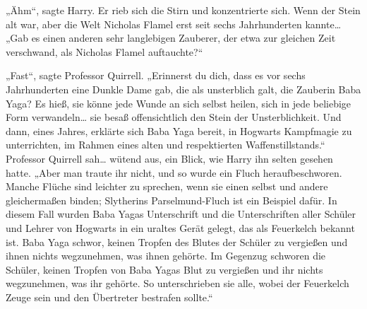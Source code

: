 „Ähm“, sagte Harry.
Er rieb sich die Stirn und konzentrierte sich.
Wenn der Stein alt war, aber die Welt Nicholas Flamel erst seit sechs Jahrhunderten kannte…
„Gab es einen anderen sehr langlebigen Zauberer, der etwa zur gleichen Zeit verschwand, als Nicholas Flamel auftauchte?“

„Fast“, sagte Professor Quirrell.
„Erinnerst du dich, dass es vor sechs Jahrhunderten eine Dunkle Dame gab, die als unsterblich galt, die Zauberin Baba Yaga? Es hieß, sie könne jede Wunde an sich selbst heilen, sich in jede beliebige Form verwandeln… sie besaß offensichtlich den Stein der Unsterblichkeit. Und dann, eines Jahres, erklärte sich Baba Yaga bereit, in Hogwarts Kampfmagie zu unterrichten, im Rahmen eines alten und respektierten Waffenstillstands.“
Professor Quirrell sah… wütend aus, ein Blick, wie Harry ihn selten gesehen hatte.
„Aber man traute ihr nicht, und so wurde ein Fluch heraufbeschworen. Manche Flüche sind leichter zu sprechen, wenn sie einen selbst und andere gleichermaßen binden; Slytherins Parselmund-Fluch ist ein Beispiel dafür. In diesem Fall wurden Baba Yagas Unterschrift und die Unterschriften aller Schüler und Lehrer von Hogwarts in ein uraltes Gerät gelegt, das als Feuerkelch bekannt ist. Baba Yaga schwor, keinen Tropfen des Blutes der Schüler zu vergießen und ihnen nichts wegzunehmen, was ihnen gehörte. Im Gegenzug schworen die Schüler, keinen Tropfen von Baba Yagas Blut zu vergießen und ihr nichts wegzunehmen, was ihr gehörte. So unterschrieben sie alle, wobei der Feuerkelch Zeuge sein und den Übertreter bestrafen sollte.“

